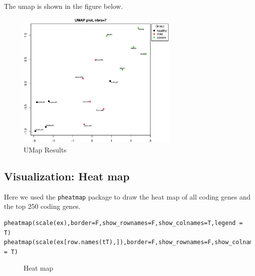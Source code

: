 \documentclass[en,black,12pt,normal]{elegantnote}
\begin{document}
The umap is shown in the figure below.
\begin{figure}[H]
    \centering
    \includegraphics[width=0.7\textwidth]{image/umap.eps}
    \caption{UMap Results}
    \label{UMAP}
\end{figure}

\subsection{Visualization: Heat map}

Here we used the \lstinline{pheatmap} package to draw the heat map of all coding genes and the top 250 coding genes.

\begin{lstlisting}
pheatmap(scale(ex),border=F,show_rownames=F,show_colnames=T,legend = T)
pheatmap(scale(ex[row.names(tT),]),border=F,show_rownames=F,show_colnames=T,legend = T)
\end{lstlisting}
\begin{figure}[H]
    \centering
    \caption{Heat map}
    \label{UMAP}
\end{figure}
\end{document}
